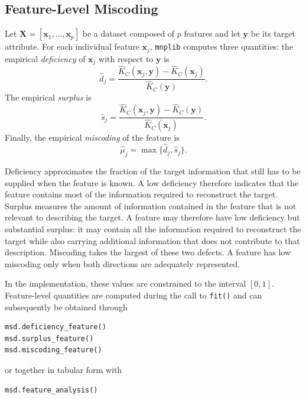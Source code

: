 
\subsection*{Feature-Level Miscoding}

Let $\mathbf{X} = \left[\mathbf{x}_1,\ldots,\mathbf{x}_p\right]$ be a dataset composed of $p$ features and let $\mathbf{y}$ be its target attribute. For each individual feature $\mathbf{x}_j$, \texttt{mnplib} computes three
quantities: the empirical \emph{deficiency} of $\mathbf{x}_j$ with respect to
$\mathbf{y}$ is
\[
\hat d_j = \frac{\hat K_C(\mathbf{x}_j,\mathbf{y}) - \hat K_C(\mathbf{x}_j)}{\hat K_C(\mathbf{y})}.
\]
The empirical \emph{surplus} is
\[
\hat s_j = \frac{\hat K_C(\mathbf{x}_j,\mathbf{y}) - \hat K_C(\mathbf{y})}{\hat K_C(\mathbf{x}_j)}.
\]
Finally, the empirical \emph{miscoding} of the feature is
\[
\hat\mu_j = \max\{\hat d_j,\hat s_j\}.
\]

Deficiency approximates the fraction of the target information that still has to be supplied when the feature is known. A low deficiency therefore indicates that the feature contains most of the information required to reconstruct the target. Surplus measures the amount of information contained in the feature that is not relevant to describing the target. A feature may therefore have low deficiency but substantial surplus: it may contain all the information required to reconstruct the target while also carrying additional information that does not contribute to that description. Miscoding takes the largest of these two defects. A feature has low miscoding only when both directions are adequately represented.

In the implementation, these values are constrained to the interval $[0,1]$. Feature-level quantities are computed during the call to \texttt{fit()} and can subsequently be obtained through

\begin{sourcecode}
{\scriptsize \begin{verbatim}
msd.deficiency_feature()
msd.surplus_feature()
msd.miscoding_feature()
\end{verbatim}}
\end{sourcecode}

or together in tabular form with

\begin{sourcecode}
{\scriptsize \begin{verbatim}
msd.feature_analysis()
\end{verbatim}}
\end{sourcecode}

